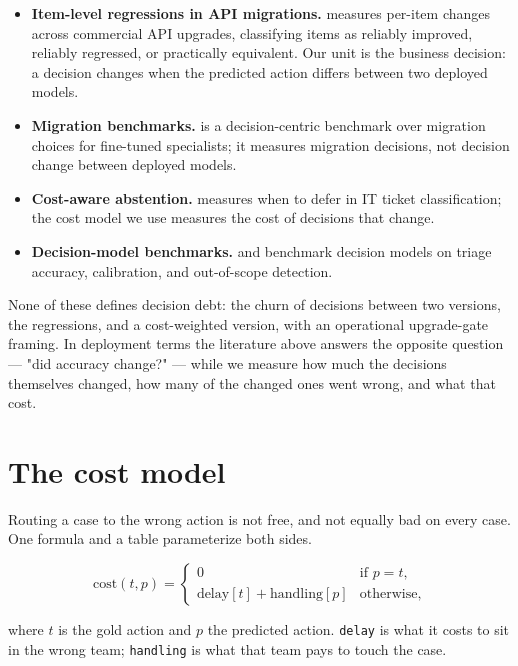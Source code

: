 \documentclass[11pt]{article}
\begin{document}
\begin{itemize}
\item \textbf{Item-level regressions in API migrations.}
  \citep{api_migration_regressions} measures per-item changes across
  commercial API upgrades, classifying items as reliably improved, reliably
  regressed, or practically equivalent. Our unit is the business decision: a
  decision changes when the predicted action differs between two deployed
  models.
\item \textbf{Migration benchmarks.} \citep{upgradebench} is a
  decision-centric benchmark over migration choices for fine-tuned
  specialists; it measures migration decisions, not decision change between
  deployed models.
\item \textbf{Cost-aware abstention.} \citep{cost_aware_abstention} measures
  when to defer in IT ticket classification; the cost model we use measures
  the cost of decisions that change.
\item \textbf{Decision-model benchmarks.} \citep{general_decision_models}
  and \citep{decision_models_triage} benchmark decision models on triage
  accuracy, calibration, and out-of-scope detection.
\end{itemize}

None of these defines decision debt: the churn of decisions between two
versions, the regressions, and a cost-weighted version, with an operational
upgrade-gate framing. In deployment terms the literature above answers the
opposite question — "did accuracy change?" — while we measure how much the
decisions themselves changed, how many of the changed ones went wrong, and
what that cost.

\section{The cost model}

Routing a case to the wrong action is not free, and not equally bad on every
case. One formula and a table parameterize both sides.

\begin{equation}
\label{eq:cost}
\text{cost}(t, p) =
\begin{cases}
0 & \text{if } p = t,\\
\text{delay}[t] + \text{handling}[p] & \text{otherwise},
\end{cases}
\end{equation}

where $t$ is the gold action and $p$ the predicted action. \texttt{delay} is
what it costs to sit in the wrong team; \texttt{handling} is what that team
pays to touch the case.
\end{document}
